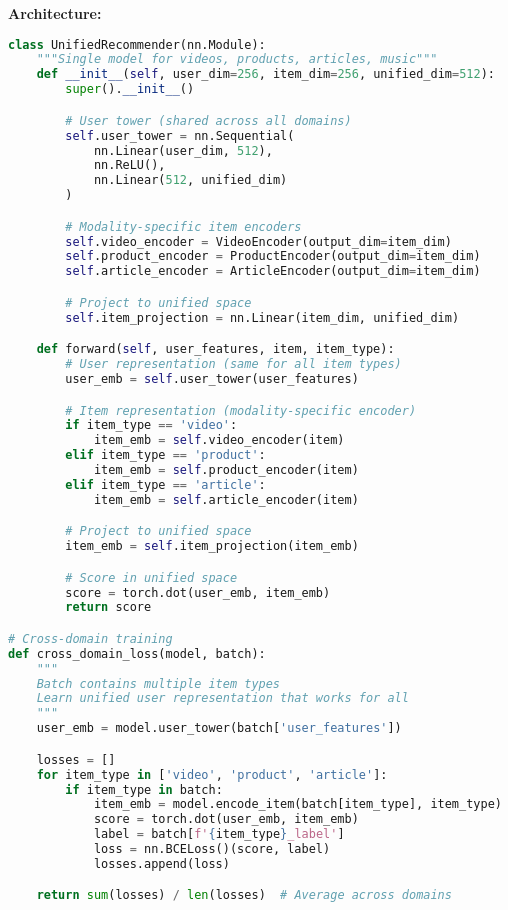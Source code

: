 \documentclass[10pt]{article}
\begin{document}
\textbf{Architecture:}
\begin{lstlisting}[language=Python]
class UnifiedRecommender(nn.Module):
    """Single model for videos, products, articles, music"""
    def __init__(self, user_dim=256, item_dim=256, unified_dim=512):
        super().__init__()

        # User tower (shared across all domains)
        self.user_tower = nn.Sequential(
            nn.Linear(user_dim, 512),
            nn.ReLU(),
            nn.Linear(512, unified_dim)
        )

        # Modality-specific item encoders
        self.video_encoder = VideoEncoder(output_dim=item_dim)
        self.product_encoder = ProductEncoder(output_dim=item_dim)
        self.article_encoder = ArticleEncoder(output_dim=item_dim)

        # Project to unified space
        self.item_projection = nn.Linear(item_dim, unified_dim)

    def forward(self, user_features, item, item_type):
        # User representation (same for all item types)
        user_emb = self.user_tower(user_features)

        # Item representation (modality-specific encoder)
        if item_type == 'video':
            item_emb = self.video_encoder(item)
        elif item_type == 'product':
            item_emb = self.product_encoder(item)
        elif item_type == 'article':
            item_emb = self.article_encoder(item)

        # Project to unified space
        item_emb = self.item_projection(item_emb)

        # Score in unified space
        score = torch.dot(user_emb, item_emb)
        return score

# Cross-domain training
def cross_domain_loss(model, batch):
    """
    Batch contains multiple item types
    Learn unified user representation that works for all
    """
    user_emb = model.user_tower(batch['user_features'])

    losses = []
    for item_type in ['video', 'product', 'article']:
        if item_type in batch:
            item_emb = model.encode_item(batch[item_type], item_type)
            score = torch.dot(user_emb, item_emb)
            label = batch[f'{item_type}_label']
            loss = nn.BCELoss()(score, label)
            losses.append(loss)

    return sum(losses) / len(losses)  # Average across domains
\end{lstlisting}
\end{document}
